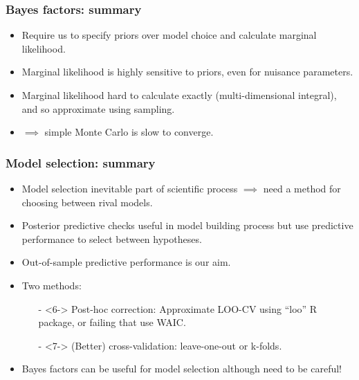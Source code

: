 \documentclass[handout]{beamer}
\begin{document}
\begin{frame}
	\frametitle{Bayes factors: summary}
	\begin{itemize}
		\item<2-> Require us to specify priors over model choice and calculate marginal likelihood.
		\item<3-> Marginal likelihood is highly sensitive to priors, even for nuisance parameters.
		\item<4-> Marginal likelihood hard to calculate exactly (multi-dimensional integral), and so approximate using sampling.
		\item<5-> $\implies$ simple Monte Carlo is slow to converge.
	\end{itemize}
\end{frame}


\begin{frame}
	\frametitle{Model selection: summary}
	
	\begin{itemize}
		\item<2-> Model selection inevitable part of scientific process $\implies$ need a method for choosing between rival models.
		\item<3-> Posterior predictive checks useful in model building process but use predictive performance to select between hypotheses.
		\item<4-> Out-of-sample predictive performance is our aim.
		\item<5-> Two methods:
		\begin{itemize}
			\item[-]<6-> Post-hoc correction: Approximate LOO-CV using ``loo'' R package, or failing that use WAIC.
			\item[-]<7-> (Better) cross-validation: leave-one-out or k-folds.
		\end{itemize}
		\item<8-> Bayes factors can be useful for model selection although need to be careful!
	\end{itemize}
	
\end{frame}
\end{document}
